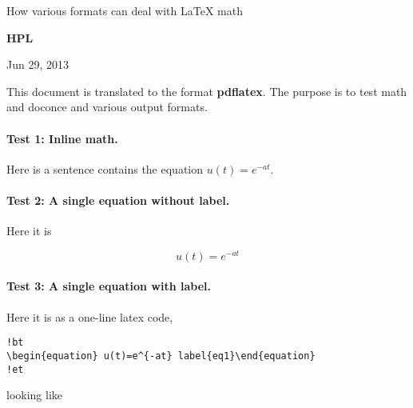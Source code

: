 \documentclass[%
oneside,                 %
final,                   %
10pt]{article}
\begin{document}






\begin{center}
{\LARGE\bf
\begin{spacing}{1.25}
How various formats can deal with {\LaTeX} math
\end{spacing}
}
\end{center}


\begin{center}
{\bf HPL${}^{}$} \\ [0mm]
\end{center}

\begin{center}
\end{center}


\begin{center}
Jun 29, 2013
\end{center}

\vspace{1cm}



This document is translated to the format \textbf{pdflatex}. The purpose is to
test math and doconce and various output formats.

\paragraph{Test 1: Inline math.}
Here is a sentence contains the equation $u(t)=e^{-at}$.

\paragraph{Test 2: A single equation without label.}
Here it is

\[ u(t)=e^{-at} \]

\paragraph{Test 3: A single equation with label.}
Here it is as a one-line
latex code,

\begin{Verbatim}[numbers=none,fontsize=\fontsize{9pt}{9pt},baselinestretch=0.95]
!bt
\begin{equation} u(t)=e^{-at} label{eq1}\end{equation}
!et
\end{Verbatim}
looking like
\end{document}
